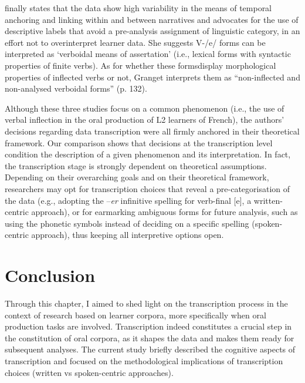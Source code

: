 \documentclass[output=paper,colorlinks,citecolor=brown,modfonts,nonflat]{../langscibook}
\begin{document}
\citet{Granget2015} finally states that the data show high variability in the means of temporal anchoring and linking within and between narratives and advocates for the use of descriptive labels that avoid a pre-analysis assignment of linguistic category, in an effort not to overinterpret learner data. She suggests V-/e/ forms can be interpreted as ‘verboidal means of assertation’ (i.e., lexical forms with syntactic properties of finite verbs). As for whether these formsdisplay morphological properties of inflected verbs or not, Granget interprets them as “non-inflected and non-analysed verboidal forms” (p. 132).

Although these three studies focus on a common phenomenon (i.e., the use of verbal inflection in the oral production of L2 learners of French), the authors’ decisions regarding data transcription were all firmly anchored in their theoretical framework. Our comparison shows that decisions at the transcription level condition the description of a given phenomenon and its interpretation. In fact, the transcription stage is strongly dependent on theoretical assumptions. Depending on their overarching goals and on their theoretical framework, researchers may opt for transcription choices that reveal a pre-categorisation of the data (e.g., adopting the –\textit{er} infinitive spelling for verb-final [e], a written-centric approach), or for earmarking ambiguous forms for future analysis, such as using the phonetic symbols instead of deciding on a specific spelling (spoken-centric approach), thus keeping all interpretive options open.

\section{Conclusion}%

Through this chapter, I aimed to shed light on the transcription process in the context of research based on learner corpora, more specifically when oral production tasks are involved. Transcription indeed constitutes a crucial step in the constitution of oral corpora, as it shapes the data and makes them ready for subsequent analyses. The current study briefly described the cognitive aspects of transcription and focused on the methodological implications of transcription choices (written vs spoken-centric approaches). 
\end{document}
